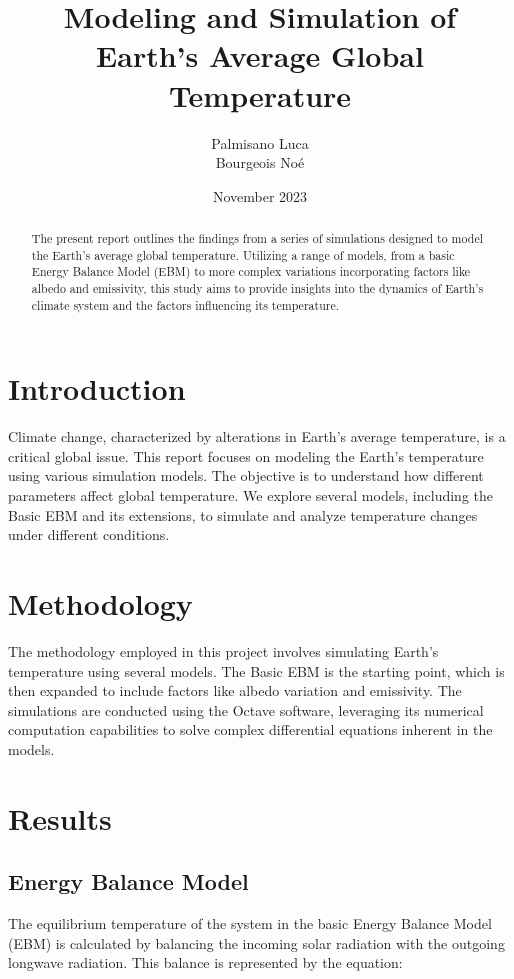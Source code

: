 \documentclass[12pt]{article}
\title{Modeling and Simulation of Earth's Average Global Temperature}
\author{Palmisano Luca \\ Bourgeois Noé}
\date{November 2023}
\begin{document}
\maketitle

\begin{abstract}
\noindent
The present report outlines the findings from a series of simulations designed to model the Earth's average global temperature. Utilizing a range of models, from a basic Energy Balance Model (EBM) to more complex variations incorporating factors like albedo and emissivity, this study aims to provide insights into the dynamics of Earth's climate system and the factors influencing its temperature.
\end{abstract}

\section{Introduction}
Climate change, characterized by alterations in Earth's average temperature, is a critical global issue. This report focuses on modeling the Earth's temperature using various simulation models. The objective is to understand how different parameters affect global temperature. We explore several models, including the Basic EBM and its extensions, to simulate and analyze temperature changes under different conditions.

\section{Methodology}
The methodology employed in this project involves simulating Earth's temperature using several models. The Basic EBM is the starting point, which is then expanded to include factors like albedo variation and emissivity. The simulations are conducted using the Octave software, leveraging its numerical computation capabilities to solve complex differential equations inherent in the models.

\section{Results}

\subsection{Energy Balance Model}
The equilibrium temperature of the system in the basic Energy Balance Model (EBM) is calculated by balancing the incoming solar radiation with the outgoing longwave radiation. This balance is represented by the equation:
\end{document}
